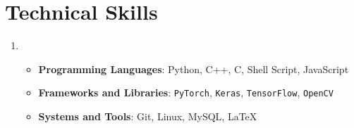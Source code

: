 \documentclass[letterpaper,11pt]{article}
\begin{document}
    \section{Technical Skills}
    \begin{enumerate}[noitemsep, leftmargin=*,label=]
        \item{
            \begin{itemize}[label=\bullet]
                \item{\textbf{Programming Languages}: Python, C++, C, Shell Script, JavaScript}
                \item{\textbf{Frameworks and Libraries}: \texttt{PyTorch}, \texttt{Keras}, \texttt{TensorFlow}, \texttt{OpenCV}}
                \item{\textbf{Systems and Tools}: Git, Linux, MySQL, \LaTeX}
            \end{itemize}
        }
    \end{enumerate}
    
\end{document}
